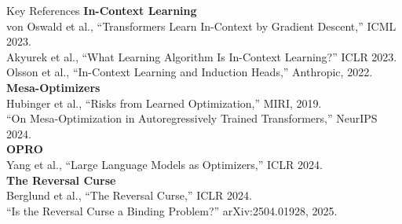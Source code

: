 \documentclass[aspectratio=169, 12pt]{beamer}
\begin{document}
\begin{frame}{Key References}
  \small
  \textbf{In-Context Learning}\\
  {\footnotesize
    von Oswald et al., ``Transformers Learn In-Context by Gradient Descent,''
    ICML 2023.\\
    Akyurek et al., ``What Learning Algorithm Is In-Context Learning?''
    ICLR 2023.\\
    Olsson et al., ``In-Context Learning and Induction Heads,''
    Anthropic, 2022.}\\[6pt]

  \textbf{Mesa-Optimizers}\\
  {\footnotesize
    Hubinger et al., ``Risks from Learned Optimization,'' MIRI, 2019.\\
    ``On Mesa-Optimization in Autoregressively Trained Transformers,''
    NeurIPS 2024.}\\[6pt]

  \textbf{OPRO}\\
  {\footnotesize
    Yang et al., ``Large Language Models as Optimizers,'' ICLR 2024.}\\[6pt]

  \textbf{The Reversal Curse}\\
  {\footnotesize
    Berglund et al., ``The Reversal Curse,'' ICLR 2024.\\
    ``Is the Reversal Curse a Binding Problem?'' arXiv:2504.01928, 2025.}

\end{frame}
\end{document}
